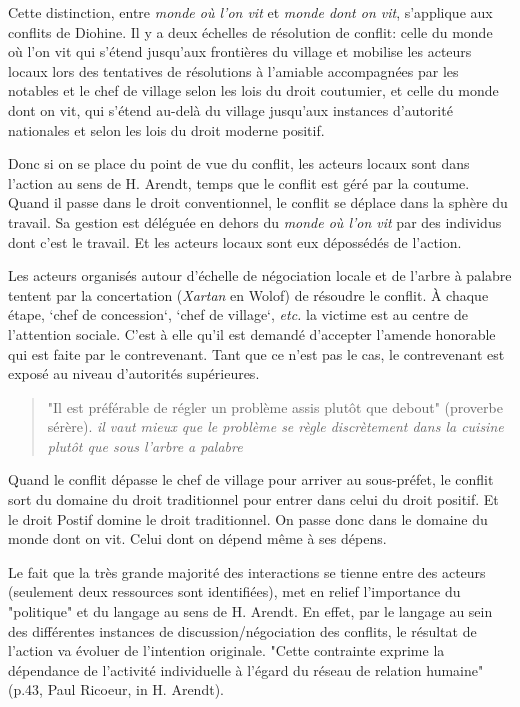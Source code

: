 Cette distinction, entre \textit{monde où l'on vit} et \textit{monde dont on vit}, s'applique aux conflits de Diohine. Il y a deux échelles de résolution de conflit:  celle du monde où l'on vit qui s'étend jusqu'aux frontières du village et mobilise les acteurs locaux lors des tentatives de résolutions à l'amiable accompagnées par les notables et le chef de village selon les lois du droit coutumier,  et celle du monde dont on vit, qui s'étend au-delà du village jusqu'aux instances d'autorité nationales et selon les lois du droit moderne positif.

Donc si on se place du point de vue du conflit, les acteurs locaux sont dans l'action au sens de H. Arendt, temps que le conflit est géré par la coutume. Quand il passe dans le droit conventionnel, le conflit se déplace dans la sphère du travail. Sa gestion est déléguée en dehors du \textit{monde où l'on vit} par des individus dont c'est le travail. Et les acteurs locaux sont eux dépossédés de l'action.

Les acteurs organisés autour d’échelle de négociation locale et de l'arbre à palabre tentent par la concertation (\textit{Xartan} en Wolof) de résoudre le conflit. À chaque étape, `chef de concession`, `chef de village`, \textit{etc.} la victime est au centre de l'attention sociale. C'est à elle qu'il est demandé d'accepter l'amende honorable qui est faite par le contrevenant. Tant que ce n'est pas le cas, le contrevenant est exposé au niveau d'autorités supérieures.

\begin{quote}
    "Il est préférable de régler un problème assis plutôt que debout" (proverbe sérère). \textit{il vaut mieux que le problème se règle discrètement dans la cuisine plutôt que sous l'arbre a palabre}
\end{quote}


Quand le conflit dépasse le chef de village pour arriver au sous-préfet, le conflit sort du domaine du droit traditionnel pour entrer dans celui du droit positif. Et le droit Postif domine le droit traditionnel. On passe donc dans le domaine du monde dont on vit. Celui dont on dépend même à ses dépens.

Le fait que la très grande majorité des interactions se tienne  entre des  acteurs (seulement deux ressources sont identifiées), met en relief l'importance du "politique" et du langage au sens de H. Arendt\cite{arendt_condition_2020}. En effet, par le langage au sein des différentes instances de discussion/négociation des conflits, le résultat de l'action va évoluer de l'intention originale. "Cette contrainte exprime la dépendance de l'activité individuelle à l'égard du réseau de relation humaine" (p.43, Paul Ricoeur, in H. Arendt\cite{arendt_condition_2020}).

